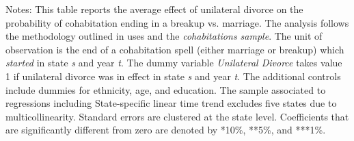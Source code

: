 \begin{table}[H]\centering                                  \scriptsize                                 \caption{The average effect of unilateral divorce on the probability that cohabitation ends in breakup vs. marriage. Unit of observation: end of a cohabitation spell}                                   \label{tab:tabsep}                                 
\begin{minipage}{\textwidth}
\scriptsize\smallskip
Notes: This table reports the average effect of unilateral divorce on the probability of cohabitation ending in a breakup vs. marriage. The analysis follows the methodology outlined in \cite{borusyak2021} uses and the \textit{cohabitations sample}. The unit of observation is the end of a cohabitation spell (either marriage or breakup) which \textit{started} in state \textit{s} and year \textit{t}. The dummy variable \textit{Unilateral Divorce} takes value 1 if unilateral divorce was in effect in state \textit{s} and year \textit{t}. The additional controls include dummies for ethnicity, age, and education. The sample associated to regressions including State-specific linear time trend excludes five states due to multicollinearity. Standard errors are clustered at the state level. Coefficients that are significantly different from zero are denoted by *10\%, **5\%, and ***1\%.
\\
\end{minipage}
\end{table}
